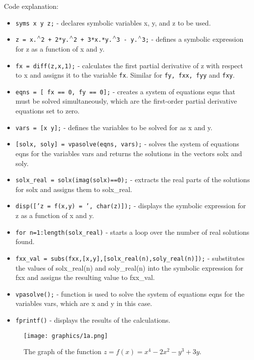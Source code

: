 Code explanation: 
\begin{itemize}
  \item \texttt{\color{mygreen}syms x y z;} - declares symbolic variables x, y, and z to be used.
  \item \texttt{\color{mygreen}z = x.$\caret$2 + 2*y.$\caret$2 + 3*x.*y.$\caret$3 - y.$\caret$3;} - defines a symbolic expression for z as a function of x and y.
  \item \texttt{\color{mygreen}fx = diff(z,x,1);} - calculates the first partial derivative of z with respect to x and assigns it to the variable \texttt{\color{mygreen}fx}. Similar for \texttt{\color{mygreen}fy, fxx, fyy} and \texttt{\color{mygreen}fxy}.
  \item \texttt{\color{mygreen}eqns = [ fx == 0, fy == 0];} - creates a system of equations eqns that must be solved simultaneously, which are the first-order partial derivative equations set to zero.
  \item \texttt{\color{mygreen}vars = [x y];} - defines the variables to be solved for as x and y.
  \item \texttt{\color{mygreen}[solx, soly] = vpasolve(eqns, vars);} - solves the system of equations eqns for the variables vars and returns the solutions in the vectors solx and soly.
  \item \texttt{\color{mygreen}solx\_real = solx(imag(solx)==0);} - extracts the real parts of the solutions for solx and assigns them to solx\_real.
  \item \texttt{\color{mygreen}disp(['z = f(x,y) = ', char(z)]);} - displays the symbolic expression for z as a function of x and y.
  \item \texttt{\color{mygreen}for n=1:length(solx\_real)} - starts a loop over the number of real solutions found.
  \item \texttt{\color{mygreen}fxx\_val = subs(fxx,[x,y],[solx\_real(n),soly\_real(n)]);} - substitutes the values of solx\_real(n) and soly\_real(n) into the symbolic expression for fxx and assigns the resulting value to fxx\_val.
  \item \texttt{\color{mygreen}vpasolve();} - function is used to solve the system of equations eqns for the variables vars, which are x and y in this case.
  \item \texttt{\color{mygreen}fprintf()} - displays the results of the calculations.
\end{itemize}

\begin{figure}[H]
  \centering
  \texttt{[image: graphics/1a.png]}
  \caption{The graph of the function $ z = f(x) = x^4 - 2x^2 - y^3 + 3y $.}
\end{figure}

